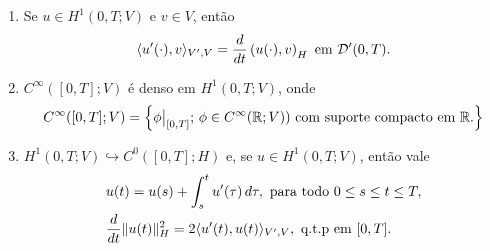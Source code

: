 \begin{frame}
\begin{prop}
\begin{enumerate}
\item Se \(u\in H^1(0,T;V)\) e \(v\in V\), então
\[
\langle u'(\cdot),v\rangle_{V',V}=\frac{d}{dt}\left(u(\cdot),v\right)_H \text{ em } \mathcal{D}'(0,T).
\]

\item \(C^\infty([0,T];V)\) {\color{blue}é denso} em \(H^1(0,T;V)\), onde 
\[C^\infty([0,T];V)=
\left\{\phi\big\vert_{[0,T]};\, \phi\in C^\infty(\mathbb{R};V))
\text{ com suporte compacto em } \mathbb{R}. \right\}
\]

\item {\color{blue}\(H^1(0,T;V)\hookrightarrow C^0([0,T];H)\)} e, se  \(u\in H^1(0,T;V)\), então vale
\begin{align*}
& u(t)=u(s)+\int_s^tu'(\tau)\,d\tau, \text{ para todo } 0\leq s\leq t\leq T,\\
& \frac{d}{dt}\lVert u(t)\rVert^2_{H}=2\langle u'(t),u(t)\rangle_{V',V}, \text{ q.t.p em } [0,T].  
\end{align*}

\end{enumerate}
\end{prop}

\end{frame}


